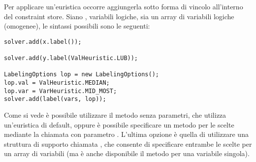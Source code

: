 Per applicare un'euristica occorre aggiungerla sotto forma di vincolo
all'interno del constraint store. Siano ,  variabili logiche,
sia  un array di variabili logiche (omogenee),
le sintassi possibili sono le seguenti:
\begin{lstlisting}[caption = {opzioni di labeling.}]
solver.add(x.label());

solver.add(y.label(ValHeuristic.LUB));

LabelingOptions lop = new LabelingOptions();
lop.val = ValHeuristic.MEDIAN;
lop.var = VarHeuristic.MID_MOST;
solver.add(label(vars, lop));
\end{lstlisting}
Come si vede è possibile utilizzare il metodo  senza parametri,
che utilizza un'euristica di default, oppure è possibile specificare 
un metodo per le scelte mediante la chiamata con parametro 
. L'ultima opzione è quella di utilizzare una 
struttura di supporto chiamata , che consente di 
specificare 
entrambe le scelte per un array di variabili (ma è anche disponibile il metodo 
per una variabile singola).
